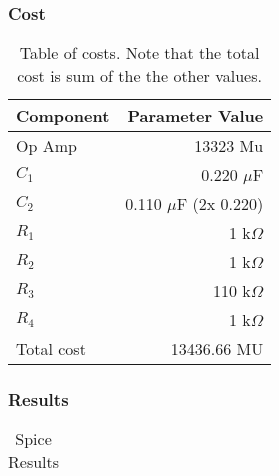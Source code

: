 \subsubsection{Cost}
\begin{table}[h]
  \centering
  \begin{tabular}{|l|r|}
    \hline    
    Component & Parameter Value \\
    \hline
    Op Amp & 13323 Mu \\
    \hline
    $C_{1}$ & 0.220 $\mu$F \\
    \hline
    $C_{2}$ & 0.110 $\mu$F (2x 0.220) \\
    \hline
    $R_{1}$ & 1 k$\Omega$ \\
    \hline
    $R_{2}$ & 1 k$\Omega$ \\
    \hline
    $R_{3}$ & 110 k$\Omega$ \\
    \hline
    $R_{4}$ & 1 k$\Omega$ \\
    \hline
    Total cost & 13436.66 MU \\
    \hline
  \end{tabular}
  \caption{Table of costs. Note that the total cost is sum of the the other values.}
  \label{tab:components}
\end{table}

\subsubsection{Results}
\begin{table}[h]
  \centering
  \begin{tabular}{|l|r|}
    \hline
    
  \end{tabular}
  \caption{Spice Results}
  \label{tab:spice}
\end{table}
